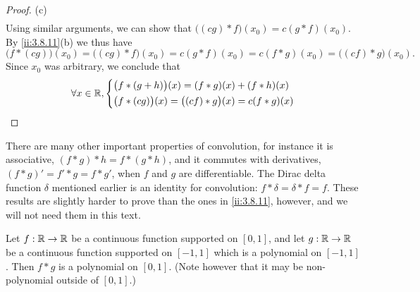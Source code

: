 \begin{proof}{(c)}
\begin{align*}
  \end{align*}
  Using similar arguments, we can show that \(\big((cg) * f\big)(x_0) = c (g * f)(x_0)\).
  By \cref{ii:3.8.11}(b) we thus have
  \[
    \big(f * (cg)\big)(x_0) = \big((cg) * f\big)(x_0) = c(g * f)(x_0) = c(f * g)(x_0) = \big((cf) * g\big)(x_0).
  \]
  Since \(x_0\) was arbitrary, we conclude that
  \[
    \forall x \in \mathbb{R}, \begin{dcases}
      \big(f * (g + h)\big)(x) = (f * g)(x) + (f * h)(x) \\
      \big(f * (cg)\big)(x) = \big((cf) * g\big)(x) = c(f * g)(x)
    \end{dcases}
  \]
\end{proof}

\begin{rmk}\label{ii:3.8.12}
  There are many other important properties of convolution, for instance it is associative, \((f * g) * h = f * (g * h)\), and it commutes with derivatives, \((f * g)' = f' * g = f * g'\), when \(f\) and \(g\) are differentiable.
  The Dirac delta function \(\delta\) mentioned earlier is an identity for convolution:
  \(f * \delta = \delta * f = f\).
  These results are slightly harder to prove than the ones in \cref{ii:3.8.11}, however, and we will not need them in this text.
\end{rmk}

\begin{lem}\label{ii:3.8.13}
  Let \(f : \mathbb{R} \to \mathbb{R}\) be a continuous function supported on \([0, 1]\), and let \(g : \mathbb{R} \to \mathbb{R}\) be a continuous function supported on \([-1, 1]\) which is a polynomial on \([-1, 1]\).
  Then \(f * g\) is a polynomial on \([0, 1]\).
  (Note however that it may be non-polynomial outside of \([0, 1].\))
\end{lem}

